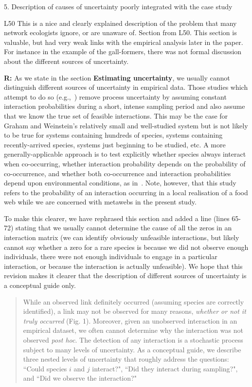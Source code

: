 \documentclass[12pt]{letter}
\newenvironment{refquote}{\bigskip \begin{it}}{\end{it}\smallskip}
\begin{document}
	5. Description of causes of uncertainty poorly integrated with the case study


		\begin{refquote}
		L50 This is a nice and clearly explained description of the problem that many network ecologists ignore, or are unaware of.
		Section from L50. This section is valuable, but had very weak links with the empirical analysis later in the paper. For instance in the example of the gall-formers, there was not formal discussion about the different sources of uncertainty. 
		\end{refquote}


		\textbf{R:} As we state in the section \textbf{Estimating uncertainty}, we usually cannot distinguish different sources of uncertainty in empirical data. Those studies which attempt to do so (e.g.,~\citet{Graham2018}) remove process uncertainty by assuming constant interaction probabilities during a short, intense sampling period and also assume that we know the true set of feasible interactions. This may be the case for Graham and Weinstein's relatively small and well-studied system but is not likely to be true for systems containing hundreds of species, systems containing recently-arrived species, systems just beginning to be studied, etc. A more generally-applicable approach is to test explicitly whether species always interact when co-occurring, whether interaction probability depends on the probability of co-occurrence, and whether both co-occurrence and interaction probabilities depend upon environmental conditions, as in~\citet{Gravel2018}. Note, however, that this study refers to the probability of an interaction occurring in a local realisation of a food web while we are concerned with metawebs in the present study.
		

		To make this clearer, we have rephrased this section and added a line (lines 65-72) stating that we usually cannot determine the cause of all the zeros in an interaction matrix (we can identify obviously unfeasible interactions, but likely cannot say whether a zero for a rare species is because we did not observe enough individuals, there were not enough individuals to engage in a particular interaction, or because the interaction is actually unfeasible). We hope that this revision makes it clearer that the description of different sources of uncertainty is a conceptual guide only.


		\begin{quotation}
			While an observed link definitely occurred (assuming species are correctly identified), a link may not be observed for many reasons, \emph{whether or not it truly occurred} (Fig. 1). Moreover, given an unobserved interaction in an empirical dataset, we often cannot determine why the interaction was not observed \emph{post hoc}. The detection of any interaction is a stochastic process subject to many levels of uncertainty. As a conceptual guide, we describe three nested levels of uncertainty that roughly address the questions: ``Could species $i$ and $j$ interact?", ``Did they interact during sampling?", and ``Did we observe the interaction?"
		\end{quotation}
\end{document}

